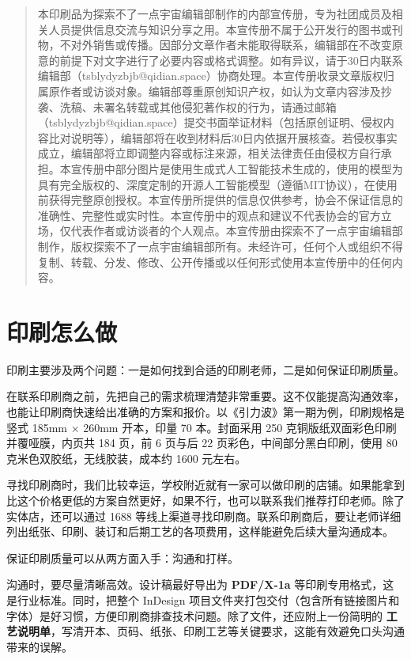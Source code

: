 \begin{quote}
本印刷品为探索不了一点宇宙编辑部制作的内部宣传册，专为社团成员及相关人员提供信息交流与知识分享之用。本宣传册不属于公开发行的图书或刊物，不对外销售或传播。因部分文章作者未能取得联系，编辑部在不改变原意的前提下对文字进行了必要内容或格式调整。如有异议，请于30日内联系编辑部（tsblydyzbjb@qidian.space）协商处理。本宣传册收录文章版权归属原作者或访谈对象。编辑部尊重原创知识产权，如认为文章内容涉及抄袭、洗稿、未署名转载或其他侵犯著作权的行为，请通过邮箱（tsblydyzbjb@qidian.space）提交书面举证材料（包括原创证明、侵权内容比对说明等），编辑部将在收到材料后30日内依据开展核查。若侵权事实成立，编辑部将立即调整内容或标注来源，相关法律责任由侵权方自行承担。本宣传册中部分图片是使用生成式人工智能技术生成的，使用的模型为具有完全版权的、深度定制的开源人工智能模型（遵循MIT协议），在使用前获得完整原创授权。本宣传册所提供的信息仅供参考，协会不保证信息的准确性、完整性或实时性。本宣传册中的观点和建议不代表协会的官方立场，仅代表作者或访谈者的个人观点。本宣传册由探索不了一点宇宙编辑部制作，版权探索不了一点宇宙编辑部所有。未经许可，任何个人或组织不得复制、转载、分发、修改、公开传播或以任何形式使用本宣传册中的任何内容。
\end{quote}

\section{印刷怎么做}\label{ux5370ux5237ux600eux4e48ux505a}

印刷主要涉及两个问题：一是如何找到合适的印刷老师，二是如何保证印刷质量。

在联系印刷商之前，先把自己的需求梳理清楚非常重要。这不仅能提高沟通效率，也能让印刷商快速给出准确的方案和报价。以《引力波》第一期为例，印刷规格是竖式
185mm × 260mm 开本，印量 70 本。封面采用 250
克铜版纸双面彩色印刷并覆哑膜，内页共 184 页，前 6 页与后 22
页彩色，中间部分黑白印刷，使用 80 克米色双胶纸，无线胶装，成本约 1600
元左右。

寻找印刷商时，我们比较幸运，学校附近就有一家可以做印刷的店铺。如果能拿到比这个价格更低的方案自然更好，如果不行，也可以联系我们推荐打印老师。除了实体店，还可以通过
1688
等线上渠道寻找印刷商。联系印刷商后，要让老师详细列出纸张、印刷、装订和后期工艺的各项费用，这样能避免后续大量沟通成本。

保证印刷质量可以从两方面入手：沟通和打样。

沟通时，要尽量清晰高效。设计稿最好导出为 \textbf{PDF/X-1a}
等印刷专用格式，这是行业标准。同时，把整个 InDesign
项目文件夹打包交付（包含所有链接图片和字体）是好习惯，方便印刷商排查技术问题。除了文件，还应附上一份简明的
\textbf{工艺说明单}，写清开本、页码、纸张、印刷工艺等关键要求，这能有效避免口头沟通带来的误解。

